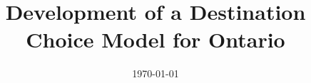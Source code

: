 \documentclass[a4paper, 11pt, oneside]{Thesis}  %
\begin{document}
\frontmatter      %

\title  {Development of a Destination Choice Model for Ontario}
\addresses  {\groupname\\\deptname\\\univname}  %
\date       {\today}
\subject    {}
\keywords   {}

\maketitle



\fancyhead{}  %
\rhead{\thepage}  %
\lhead{}  %

\pagestyle{fancy}  %
\end{document}
